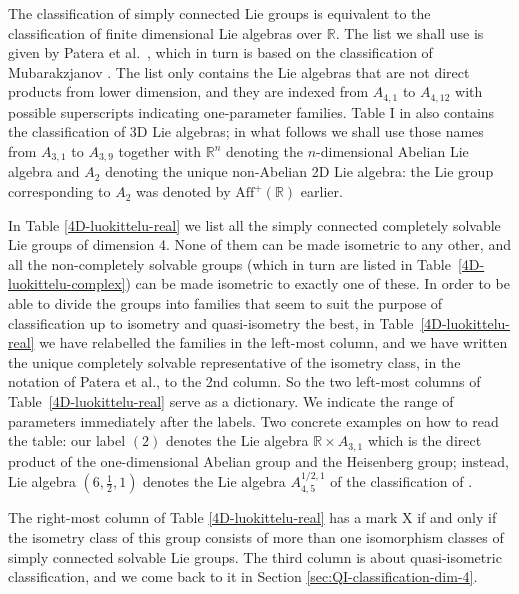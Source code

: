 \documentclass[a4paper,12pt]{amsart}
\newcommand{\pp}{\mathrm}
\theoremstyle{plain}
\theoremstyle{definition}
\theoremstyle{plain}
\theoremstyle{remark}
\begin{document}
The classification of simply connected Lie groups is equivalent to the classification of finite dimensional Lie algebras over \( \mathbb{R} \).
The list we shall use is given by Patera et al.\ \cite[Table I, p. 988]{avain:Patera}, which in turn is based on the classification of Mubarakzjanov \cite{avain:mubarakzjanov2,avain:mubarakzjanov1}. The list only contains the Lie algebras that are not direct products from lower dimension, and they are indexed from \( A_{4,1} \) to \( A_{4,12} \) with possible superscripts indicating one-parameter families. 
Table I in \cite{avain:Patera} also contains the classification of 3D Lie algebras; in what follows we shall use those names from \( A_{3,1} \) to \( A_{3,9} \) together with \( \mathbb{R}^n \) denoting the \(n\)-dimensional Abelian Lie algebra and \( A_2 \) denoting the unique non-Abelian 2D Lie algebra: the Lie group corresponding to \( A_2 \) was denoted by \( \pp{Aff}^+(\mathbb{R}) \) earlier.

In Table \ref{4D-luokittelu-real} we list all the simply connected completely solvable Lie groups of dimension 4. 
None of them can be made isometric to any other, and all the non-completely solvable groups (which in turn are listed in Table~\ref{4D-luokittelu-complex}) can be made isometric to exactly one of these.
In order to be able to divide the groups into families that seem to suit the purpose of classification up to isometry and quasi-isometry the best, in  Table~\ref{4D-luokittelu-real} we have relabelled the families in the left-most column, and we have written the unique completely solvable representative of the isometry class, in the notation of Patera et al., to the 2nd column. So the two left-most columns of Table~\ref{4D-luokittelu-real} serve as a dictionary. We indicate the range of parameters immediately after the labels. Two concrete examples on how to read the table: our label \( (2) \) denotes the Lie algebra \( \mathbb{R} \times  A_{3,1}  \) which is the direct product of the one-dimensional Abelian group and the Heisenberg group; instead, Lie algebra \( (6,\frac{1}{2},1)\) denotes the Lie algebra \( A_{4,5}^{1/2,1} \) of the classification of \cite{avain:Patera}. 

The right-most column of Table \ref{4D-luokittelu-real} has a mark X if and only if the isometry class of this group consists of more than one isomorphism classes of simply connected solvable Lie groups. 
The third column is about quasi-isometric classification, and we come back to it in Section \ref{sec:QI-classification-dim-4}.
\end{document}
